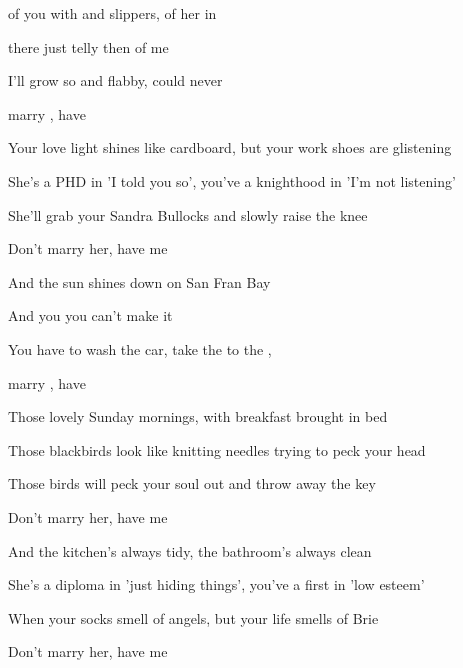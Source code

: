 
\zs

 of you with  and slippers,  of her in 

 there just  telly then  of me 

I'll  grow so  and flabby,  could never 

 marry , have 
\ks

\zs
Your love light shines like cardboard, but your work shoes are glistening

She's a PHD in 'I told you so', you've a knighthood in 'I'm not listening'

She'll grab your Sandra Bullocks and slowly raise the knee

Don't marry her, have me
\ks

\zr

And the  sun shines down on San Fran Bay

And you  you can't make it 

You have to wash the car, take the  to the ,

 marry , have 
\kr

\zs
Those lovely Sunday mornings, with breakfast brought in bed

Those blackbirds look like knitting needles trying to peck your head

Those birds will peck your soul out and throw away the key

Don't marry her, have me
\ks

\zs
And the kitchen's always tidy, the bathroom's always clean

She's a diploma in 'just hiding things', you've a first in 'low esteem'

When your socks smell of angels, but your life smells of Brie

Don't marry her, have me
\ks

\zr
\kr

\zr
\kr

\kp